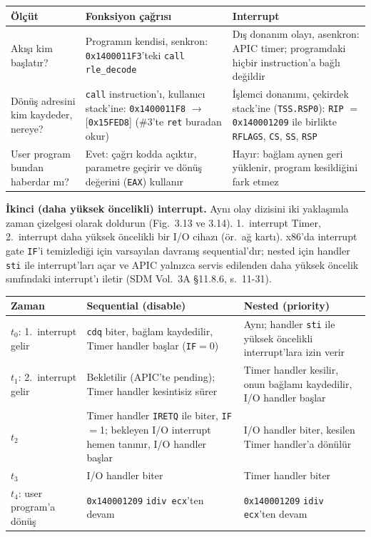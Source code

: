 \documentclass[11pt,a4paper]{article}
\newcommand{\tl}{\texttt}
\newcommand{\hd}[1]{\cellcolor{hdr}#1}
\begin{document}
\begin{longtable}{|p{3.6cm}|p{6.1cm}|p{5.8cm}|}
\hline
\hd{Ölçüt} & \hd{Fonksiyon çağrısı} & \hd{Interrupt}\\
\hline
Akışı kim başlatır? & Programın kendisi, senkron: \tl{0x1400011F3}'teki \tl{call rle\_decode} & Dış donanım olayı, asenkron: APIC timer; programdaki hiçbir instruction'a bağlı değildir\\ \hline
Dönüş adresini kim kaydeder, nereye? & \tl{call} instruction'ı, kullanıcı stack'ine: \tl{0x1400011F8} $\to$ [\tl{0x15FED8}] (\#3'te \tl{ret} buradan okur) & İşlemci donanımı, çekirdek stack'ine (\tl{TSS.RSP0}): \tl{RIP} $=$ \tl{0x140001209} ile birlikte \tl{RFLAGS}, \tl{CS}, \tl{SS}, \tl{RSP}\\ \hline
User program bundan haberdar mı? & Evet: çağrı kodda açıktır, parametre geçirir ve dönüş değerini (\tl{EAX}) kullanır & Hayır: bağlam aynen geri yüklenir, program kesildiğini fark etmez\\ \hline
\end{longtable}

\textbf{İkinci (daha yüksek öncelikli) interrupt.} Aynı olay dizisini iki yaklaşımla zaman
çizelgesi olarak doldurun (Fig.~3.13 ve 3.14). 1.~interrupt Timer, 2.~interrupt daha yüksek
öncelikli bir I/O cihazı (ör.\ ağ kartı). x86'da interrupt gate \tl{IF}'i temizlediği için
varsayılan davranış sequential'dır; nested için handler \tl{sti} ile interrupt'ları açar ve
APIC yalnızca servis edilenden daha yüksek öncelik sınıfındaki interrupt'ı iletir (SDM Vol.~3A
§11.8.6, s.~11-31).

\begin{longtable}{|p{3.4cm}|p{6.1cm}|p{6.0cm}|}
\hline
\hd{Zaman} & \hd{Sequential (disable)} & \hd{Nested (priority)}\\
\hline
$t_0$: 1.~interrupt gelir & \tl{cdq} biter, bağlam kaydedilir, Timer handler başlar (\tl{IF}$=$0) & Aynı; handler \tl{sti} ile yüksek öncelikli interrupt'lara izin verir\\ \hline
$t_1$: 2.~interrupt gelir & Bekletilir (APIC'te pending); Timer handler kesintisiz sürer & Timer handler kesilir, onun bağlamı kaydedilir, I/O handler başlar\\ \hline
$t_2$ & Timer handler \tl{IRETQ} ile biter, \tl{IF}$=$1; bekleyen I/O interrupt hemen tanınır, I/O handler başlar & I/O handler biter, kesilen Timer handler'a dönülür\\ \hline
$t_3$ & I/O handler biter & Timer handler biter\\ \hline
$t_4$: user program'a dönüş & \tl{0x140001209} \tl{idiv ecx}'ten devam & \tl{0x140001209} \tl{idiv ecx}'ten devam\\ \hline
\end{longtable}
\end{document}
